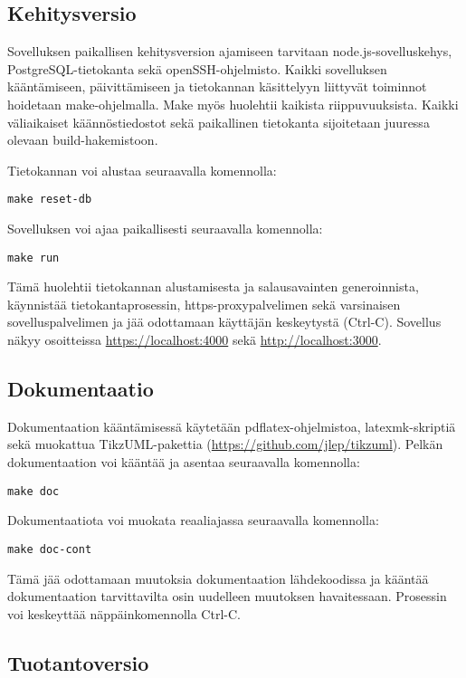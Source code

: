 \documentclass[a4paper,parskip=half]{scrartcl}
\begin{document}
\subsection{Kehitysversio}

Sovelluksen paikallisen kehitysversion ajamiseen tarvitaan
node.js-sovelluskehys, PostgreSQL-tietokanta sekä openSSH-ohjelmisto. Kaikki
sovelluksen kääntämiseen, päivittämiseen ja tietokannan käsittelyyn
liittyvät toiminnot hoidetaan make-ohjelmalla. Make myös huolehtii kaikista
riippuvuuksista. Kaikki väliaikaiset käännöstiedostot sekä
paikallinen tietokanta sijoitetaan juuressa olevaan build-hakemistoon.

Tietokannan voi alustaa seuraavalla komennolla:
\begin{Verbatim}
make reset-db
\end{Verbatim}

Sovelluksen voi ajaa paikallisesti seuraavalla komennolla:
\begin{Verbatim}
make run
\end{Verbatim}
Tämä huolehtii tietokannan alustamisesta ja salausavainten generoinnista,
käynnistää tietokantaprosessin, https-proxypalvelimen sekä varsinaisen
sovelluspalvelimen ja jää odottamaan käyttäjän keskeytystä (Ctrl-C).
Sovellus näkyy osoitteissa \url{https://localhost:4000} sekä
\url{http://localhost:3000}.

\subsection{Dokumentaatio}
Dokumentaation kääntämisessä käytetään pdflatex-ohjelmistoa, latexmk-skriptiä
sekä muokattua TikzUML-pakettia (\url{https://github.com/jlep/tikzuml}).
Pelkän dokumentaation voi kääntää ja asentaa seuraavalla komennolla:
\begin{Verbatim}
make doc
\end{Verbatim}

Dokumentaatiota voi muokata reaaliajassa seuraavalla komennolla:
\begin{Verbatim}
make doc-cont
\end{Verbatim}
Tämä jää odottamaan muutoksia dokumentaation lähdekoodissa ja kääntää
dokumentaation tarvittavilta osin uudelleen muutoksen havaitessaan. Prosessin
voi keskeyttää näppäinkomennolla Ctrl-C.

\subsection{Tuotantoversio}
\end{document}
